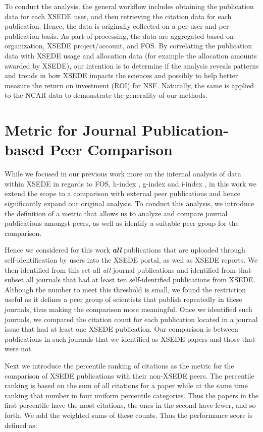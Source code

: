 \documentclass{sig-alternate}
\begin{document}
To conduct the analysis, the general workflow includes obtaining the publication data for each XSEDE user, and then retrieving the citation data for each publication. Hence, the data is originally collected on a per-user and per-publication basis. As part of processing, the data are aggregated based on organization, XSEDE project/account, and FOS.  By correlating the publication data with XSEDE usage and allocation data (for example the allocation amounts awarded by XSEDE), our intention is to determine if the analysis reveals patterns and trends in how XSEDE impacts the sciences and possibly to help better measure the return on investment (ROI) for NSF. Naturally, the same is applied to the NCAR data to demonstrate the generality of our methods.

\section{Metric for Journal Publication-based Peer Comparison} \label{S:metric}

While we focused in our previous work more on the internal analysis of data within XSEDE in regards to FOS, h-index \cite{hirsch2005index}, g-index \cite{www-i10index} and i-index \cite{egghe2006theory}, in this work we extend the scope to a comparison with external peer publications and hence significantly expand our original analysis. To conduct this analysis, we introduce the definition of a metric that allows us to analyze and compare journal publications amongst peers, as well as identify a suitable peer group for the comparison.

Hence we considered for this work {\em\bf all} publications that are uploaded through self-identification by users into the XSEDE portal, as well as XSEDE reports. We then identified from this set all {\em all} journal publications and identified from that subset all journals that had at least ten self-identified publications from XSEDE. Although the number to meet this threshold is small, we found the restriction useful as it defines a peer group of scientists that publish repeatedly in these journals, thus making the comparison more meaningful. Once we identified such journals, we compared the citation count for each publication located in a journal issue that had at least one XSEDE publication. Our comparison is between publications in such journals that we identified as XSEDE papers and those that were not. 

Next we introduce the percentile ranking of citations as the metric for the comparison of XSEDE publications with their non-XSEDE peers. The percentile ranking is based on the sum of all citations for a paper while at the same time ranking that number in four uniform percentile categories. Thus the papers in the first percentile have the most citations, the ones in the second have fewer, and so forth.  We add the weighted sums of these counts. Thus the performance score is defined as:
\end{document}
